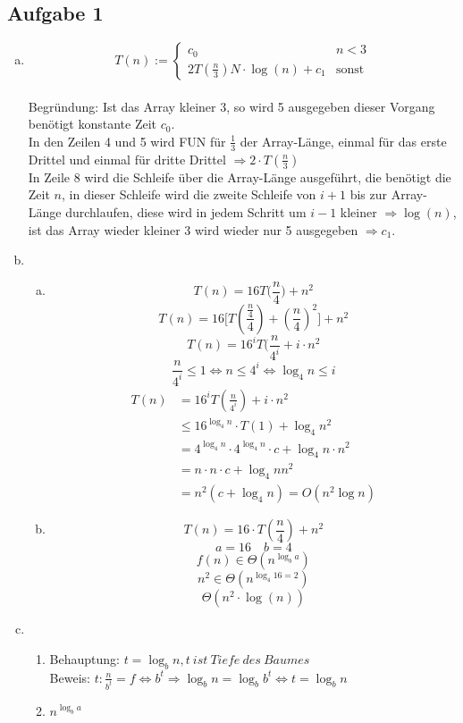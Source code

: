 \documentclass[a4paper,fleqn]{scrartcl}
\begin{document}
\subsection*{Aufgabe 1}
\begin{enumerate}[a)]
 \item
 \[ T(n):= \begin{cases}
    c_0 & n < 3 \\ 
    2T\left( \frac{n}{3} \right) N \cdot \log(n) + c_1 & \text{sonst}
   \end{cases}\] \\
   Begründung: Ist das Array kleiner 3, so wird 5 ausgegeben dieser Vorgang benötigt konstante Zeit $c_0$. \\
   In den Zeilen 4 und 5 wird FUN für $\frac{1}{3}$ der Array-Länge, einmal für das erste Drittel und einmal für dritte Drittel $\Rightarrow 2\cdot T(\frac{n}{3}) $ \\
   In Zeile 8 wird die Schleife über die Array-Länge ausgeführt, die benötigt die Zeit $n$, in dieser Schleife wird die zweite Schleife von $i+1$ bis zur Array-Länge durchlaufen, diese wird in jedem Schritt um $i-1$ kleiner $\Rightarrow \log(n)$, ist das Array wieder kleiner 3 wird wieder nur 5 ausgegeben $\Rightarrow c_1$.
 \item
 \begin{enumerate}[(a)]
  \item \[ T(n) = 16 T\Big(\frac n 4\Big) + n^2 \]
\[ T(n) = 16 \Big[T(\frac {\frac n 4} 4) + (\frac n 4)^2 \Big] + n^2\]
\[ T(n) = 16^i T(\frac n {4^i} + i \cdot n^2\]
\[ \frac n {4^i} \leq 1 \Leftrightarrow n \leq 4^i \Leftrightarrow \log_4 n \leq i \]
\begin{align*}
T(n) &= 16^i T(\frac n {4^i}) + i \cdot n^2\\
     &\leq 16^{\log_4 n} \cdot T(1) + \log_4 n^2\\
     &= 4^{\log_4 n} \cdot 4^{\log_4 n} \cdot c + \log_4 n \cdot n^2\\
     &= n \cdot n \cdot c + \log_4 n n^2\\
     &= n^2 (c + \log_4 n) = O(n^2\log n)
\end{align*}
  \item \[ T(n) = 16 \cdot T\left( \frac{n}{4} \right) + n^2 \]
\[ a= 16 \quad b = 4 \]
\[ f(n) \in \Theta \left( n^{\log_b a} \right) \]
\[ n^2 \in \Theta \left( n^{\log_4 16=2} \right) \]
\[ \Theta \left(n^2 \cdot \log(n)\right) \]
 \end{enumerate}

 \item 
 \begin{enumerate}[1.]
  \item Behauptung: \(t=\log_b n, t\ ist\ Tiefe\ des\ Baumes\) \\
        Beweis: \(t: \frac n {b^t} = f \Leftrightarrow b^t \Rightarrow \log_b n = \log_b b^t \Leftrightarrow t=\log_b n\)
  \item $ n^{\log_b a} $
 \end{enumerate}

\end{enumerate}
 
\end{document}
